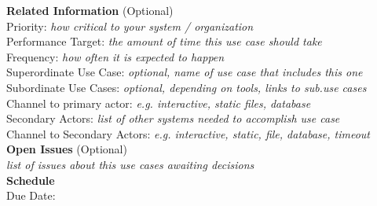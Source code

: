 {\bf Related Information} (Optional) \\
Priority: {\it how critical to your system / organization} \\
Performance Target: {\it the amount of time this use case should take} \\
Frequency: {\it how often it is expected to happen} \\
Superordinate Use Case: {\it optional, name of use case that includes this one} \\
Subordinate Use Cases: {\it optional, depending on tools, links to sub.use cases} \\
Channel to primary actor: {\it e.g. interactive, static files, database} \\
Secondary Actors: {\it list of other systems needed to accomplish use case} \\
Channel to Secondary Actors: {\it e.g. interactive, static, file, database, timeout} \\

{\bf Open Issues} (Optional) \\
{\it list of issues about this use cases awaiting decisions} \\

{\bf Schedule} \\
Due Date: \\
